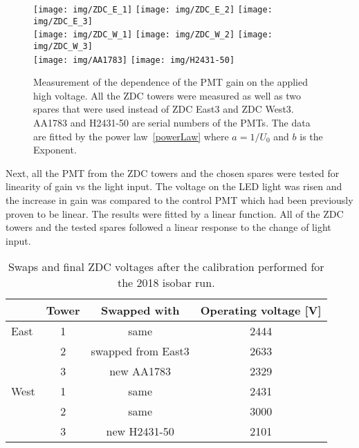 \begin{figure}[!htb]
\texttt{[image: img/ZDC\_E\_1]}
\texttt{[image: img/ZDC\_E\_2]}
\texttt{[image: img/ZDC\_E\_3]}\\
\texttt{[image: img/ZDC\_W\_1]}
\texttt{[image: img/ZDC\_W\_2]}
\texttt{[image: img/ZDC\_W\_3]}\\
\texttt{[image: img/AA1783]}
\texttt{[image: img/H2431-50]}
\caption[Measurement of the dependence of the PMT gain on the applied high voltage.]{\label{ZDCgains}Measurement of the dependence of the PMT gain on the applied high voltage. All the ZDC towers were measured as well as two spares that were used instead of ZDC East3 and ZDC West3\@. AA1783 and H2431-50 are serial numbers of the PMTs. The data are fitted by the power law~\eqref{powerLaw} where $a=1/U_0$ and $b$ is the Exponent.}
\end{figure}

Next, all the PMT from the ZDC towers and the chosen spares were tested for linearity of gain vs the light input. The voltage on the LED light was risen and the increase in gain was compared to the control PMT which had been previously proven to be linear. The results were fitted by a linear function. All of the ZDC towers and the tested spares followed a linear response to the change of light input.


\begin{table}[!htb] 
\caption[Swaps and final ZDC voltages after the calibration performed for the 2018 isobar run]{\label{HVtable}Swaps and final ZDC voltages after the calibration performed for the 2018 isobar run.}
\label{corected}
\begin{center}
\begin{tabular}{lccc}
\toprule
 &Tower&Swapped with&Operating voltage [V]\\
\midrule
East  &1 & same & 2444 \\
      &2 & swapped from East3 & 2633 \\
      &3 & new AA1783 & 2329 \\
\midrule
West  &1 & same & 2431  \\
      &2 & same & 3000  \\
      &3 & new H2431-50 & 2101 \\
\bottomrule
\end{tabular}
\end{center}
\end{table}


